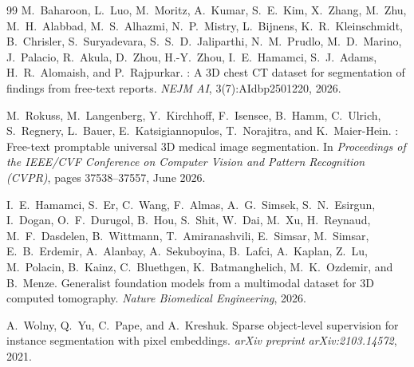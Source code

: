 \documentclass[11pt,a4paper]{article}
\begin{document}
\begin{thebibliography}{99}
M.~Baharoon, L.~Luo, M.~Moritz, A.~Kumar, S.~E.~Kim, X.~Zhang, M.~Zhu, M.~H.~Alabbad, M.~S.~Alhazmi, N.~P.~Mistry, L.~Bijnens, K.~R.~Kleinschmidt, B.~Chrisler, S.~Suryadevara, S.~S.~D.~Jaliparthi, N.~M.~Prudlo, M.~D.~Marino, J.~Palacio, R.~Akula, D.~Zhou, H.-Y.~Zhou, I.~E.~Hamamci, S.~J.~Adams, H.~R.~Alomaish, and P.~Rajpurkar.
: A 3{D} chest {CT} dataset for segmentation of findings from free-text reports.
\newblock \emph{NEJM AI}, 3(7):AIdbp2501220, 2026.

M.~Rokuss, M.~Langenberg, Y.~Kirchhoff, F.~Isensee, B.~Hamm, C.~Ulrich, S.~Regnery, L.~Bauer, E.~Katsigiannopulos, T.~Norajitra, and K.~Maier-Hein.
: Free-text promptable universal 3{D} medical image segmentation.
\newblock In \emph{Proceedings of the IEEE/CVF Conference on Computer Vision and Pattern Recognition (CVPR)}, pages 37538--37557, June 2026.

I.~E.~Hamamci, S.~Er, C.~Wang, F.~Almas, A.~G.~Simsek, S.~N.~Esirgun, I.~Dogan, O.~F.~Durugol, B.~Hou, S.~Shit, W.~Dai, M.~Xu, H.~Reynaud, M.~F.~Dasdelen, B.~Wittmann, T.~Amiranashvili, E.~Simsar, M.~Simsar, E.~B.~Erdemir, A.~Alanbay, A.~Sekuboyina, B.~Lafci, A.~Kaplan, Z.~Lu, M.~Polacin, B.~Kainz, C.~Bluethgen, K.~Batmanghelich, M.~K.~Ozdemir, and B.~Menze.
\newblock Generalist foundation models from a multimodal dataset for 3{D} computed tomography.
\newblock \emph{Nature Biomedical Engineering}, 2026.

A.~Wolny, Q.~Yu, C.~Pape, and A.~Kreshuk.
\newblock Sparse object-level supervision for instance segmentation with pixel embeddings.
\newblock \emph{arXiv preprint arXiv:2103.14572}, 2021.
\end{thebibliography}
\end{document}
